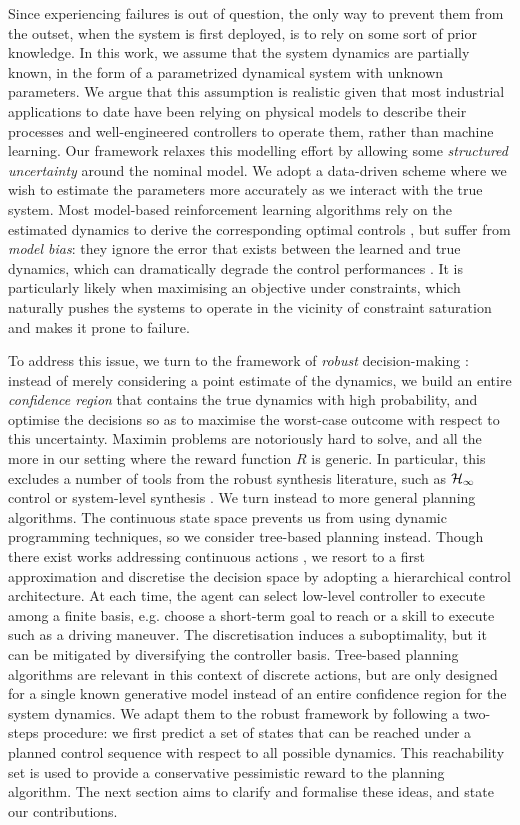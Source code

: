 Since experiencing failures is out of question, the only way to prevent them from the outset, when the system is first deployed, is to rely on some sort of prior knowledge. In this work, we assume that the system dynamics are partially known, in the form of a parametrized dynamical system with unknown parameters. We argue that this assumption is realistic given that most industrial applications to date have been relying on physical models to describe their processes and well-engineered controllers to operate them, rather than machine learning. Our framework relaxes this modelling effort by allowing some \emph{structured uncertainty} around the nominal model. We adopt a data-driven scheme where we wish to estimate the parameters more accurately as we interact with the true system. Most model-based reinforcement learning algorithms rely on the estimated dynamics to derive the corresponding optimal controls \citep[e.g.][]{Lenz2015,Levine2015}, but suffer from \emph{model bias}: they ignore the error that exists between the learned and true dynamics, which can dramatically degrade the control performances \citep{Schneider1997}. It is particularly likely when maximising an objective under constraints, which naturally pushes the systems to operate in the vicinity of constraint saturation and makes it prone to failure.

To address this issue, we turn to the framework of \emph{robust} decision-making \citep{Bental2009,Bertsimas2011,Gorissen2015}: instead of merely considering a point estimate of the dynamics, we build an entire \emph{confidence region} that contains the true dynamics with high probability, and optimise the decisions so as to maximise the worst-case outcome with respect to this uncertainty. Maximin problems are notoriously hard to solve, and all the more in our setting where the reward function $R$ is generic. In particular, this excludes a number of tools from the robust synthesis literature, such as $\mathcal{H}_\infty$ control \citep[see, e.g.][]{Basar1996} or system-level synthesis \citep{Dean2017,Dean2018}. We turn instead to more general planning algorithms. The continuous state space prevents us from using dynamic programming techniques, so we consider tree-based planning instead. Though there exist works addressing continuous actions \citep{Busoniu2018,Weinstein2012}, we resort to a first approximation and discretise the decision space by adopting a hierarchical control architecture. At each time, the agent can select low-level controller to execute among a finite basis, e.g. choose a short-term goal to reach or a skill to execute such as a driving maneuver. The discretisation induces a suboptimality, but it can be mitigated by diversifying the controller basis. Tree-based planning algorithms are relevant in this context of discrete actions, but are only designed for a single known generative model instead of an entire confidence region for the system dynamics. We adapt them to the robust framework by following a two-steps procedure: we first predict a set of states that can be reached under a planned control sequence with respect to all possible dynamics. This reachability set is used to provide a conservative pessimistic reward to the planning algorithm. The next section aims to clarify and formalise these ideas, and state our contributions.



